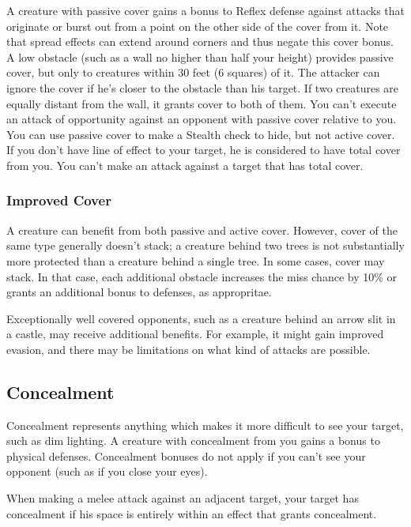  A creature with passive cover gains a  bonus to Reflex defense against attacks that originate or burst out from a point on the other side of the cover from it. Note that spread effects can extend around corners and thus negate this cover bonus.
 A low obstacle (such as a wall no higher than half your height) provides passive cover, but only to creatures within 30 feet (6 squares) of it. The attacker can ignore the cover if he's closer to the obstacle than his target. If two creatures are equally distant from the wall, it grants cover to both of them.
 You can't execute an attack of opportunity against an opponent with passive cover relative to you.
 You can use passive cover to make a Stealth check to hide, but not active cover.
 If you don't have line of effect to your target, he is considered to have total cover from you. You can't make an attack against a target that has total cover.

\subsubsection{Improved Cover}

A creature can benefit from both passive and active cover. However, cover of the same type generally doesn't stack; a creature behind two trees is not substantially more protected than a creature behind a single tree. In some cases, cover may stack. In that case, each additional obstacle increases the miss chance by 10\% or grants an additional  bonus to defenses, as appropritae.

Exceptionally well covered opponents, such as a creature behind an arrow slit in a castle, may receive additional benefits. For example, it might gain improved evasion, and there may be limitations on what kind of attacks are possible.

\subsection{Concealment}\label{Concealment}
Concealment represents anything which makes it more difficult to see your target, such as dim lighting. A creature with concealment from you gains a  bonus to physical defenses. Concealment bonuses do not apply if you can't see your opponent (such as if you close your eyes).

 When making a melee attack against an adjacent target, your target has concealment if his space is entirely within an effect that grants concealment.

